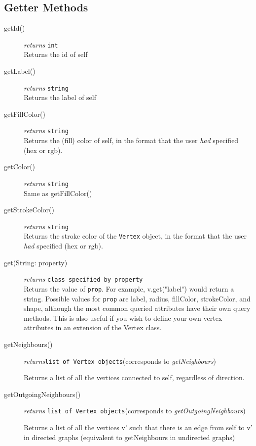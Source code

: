 \documentclass{article}
\newcounter{example}
\newlength\q
\begin{document}
\subsection{Getter Methods}
\begin{description}
\item[getId()] \emph{returns} \texttt{int}\\
Returns the id of self

\item[getLabel()] \emph{returns} \texttt{string}\\
Returns the label of self

\item[getFillColor()] \emph{returns} \texttt{string}\\
Returns the (fill) color of self, in the format that the user \textit{had} specified (hex or rgb).

\item[getColor()] \emph{returns} \texttt{string}\\
Same as getFillColor()

\item[getStrokeColor()] \emph{returns} \texttt{string}\\
Returns the stroke color of the \texttt{Vertex} object, in the format that the user \textit{had} specified (hex or rgb).

\item[get(String: property)] \emph{returns} \texttt{class specified by property}\\
Returns the value of \texttt{prop}. For example, v.get("label") would return a string. Possible values for \texttt{prop} are label, radius, fillColor, strokeColor, and shape, although the most common queried attributes have their own query methods. This is also useful if you wish to define your own vertex attributes in an extension of the Vertex class.

\label{getNeighboursClass}\item[getNeighbours()]\emph{returns}\texttt{list of Vertex objects}\quad(corresponds to \textit{getNeighbours})


Returns a list of all the vertices connected to self, regardless of direction.

\label{getOutgoingNeighboursClass}\item[getOutgoingNeighbours()]\emph{returns} \texttt{list of Vertex objects}\quad(corresponds to \textit{getOutgoingNeighbours})

Returns a list of all the vertices v' such that there is an edge from self to v' in directed graphs (equivalent to getNeighbours in undirected graphs)


\end{description}
\end{document}

